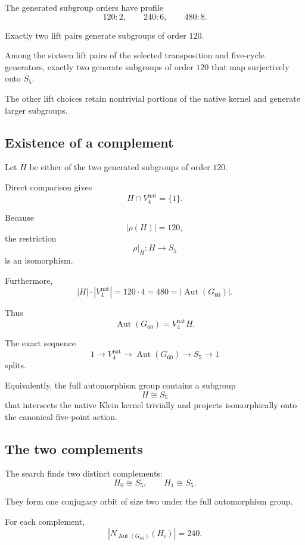 The generated subgroup orders have profile
\[
120:2,
\qquad
240:6,
\qquad
480:8.
\]

Exactly two lift pairs generate subgroups of order \(120\).

\begin{proposition}
Among the sixteen lift pairs of the selected transposition and
five-cycle generators, exactly two generate subgroups of order
\(120\) that map surjectively onto \(S_5\).
\end{proposition}

The other lift choices retain nontrivial portions of the native kernel
and generate larger subgroups.

\subsection{Existence of a complement}

Let \(H\) be either of the two generated subgroups of order \(120\).

Direct comparison gives
\[
H\cap V_4^{\mathrm{nat}}=\{1\}.
\]

Because
\[
|\rho(H)|=120,
\]
the restriction
\[
\rho|_H:H\longrightarrow S_5
\]
is an isomorphism.

Furthermore,
\[
|H|\cdot|V_4^{\mathrm{nat}}|
=
120\cdot4
=
480
=
|\operatorname{Aut}(G_{60})|.
\]

Thus
\[
\operatorname{Aut}(G_{60})
=
V_4^{\mathrm{nat}}H.
\]

\begin{theorem}
The exact sequence
\[
1
\longrightarrow
V_4^{\mathrm{nat}}
\longrightarrow
\operatorname{Aut}(G_{60})
\longrightarrow
S_5
\longrightarrow
1
\]
splits.
\end{theorem}

Equivalently, the full automorphism group contains a subgroup
\[
H\cong S_5
\]
that intersects the native Klein kernel trivially and projects
isomorphically onto the canonical five-point action.

\subsection{The two complements}

The search finds two distinct complements:
\[
H_0\cong S_5,
\qquad
H_1\cong S_5.
\]

They form one conjugacy orbit of size two under the full automorphism
group.

For each complement,
\[
|N_{\operatorname{Aut}(G_{60})}(H_i)|=240.
\]

